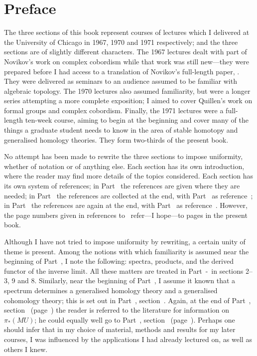 \documentclass[main]{subfiles}
\begin{document}
\chapter*{Preface}
The three sections of this book represent courses of lectures which I delivered at the University of Chicago in 1967, 1970 and 1971 respectively; and the three sections are of slightly different characters.
The 1967 lectures dealt with part of Novikov's work on complex cobordism while that work was still new---they were prepared before I had access to a translation of Novikov's full-length paper, . 
They were delivered as seminars to an audience assumed to be familiar with algebraic topology. 
The 1970 lectures also assumed familiarity, but were a longer series attempting a more complete exposition; I aimed to cover Quillen's work on formal groups and complex cobordism.
Finally, the 1971 lectures were a full-length ten-week course, aiming to begin at the beginning and cover many of the things a graduate student needs to know in the area of stable homotopy and generalised homology theories.
They form two-thirds of the present book.

No attempt has been made to rewrite the three sections to impose uniformity, whether of notation or of anything else. 
Each section has its own introduction, where the reader may find more details of the topics considered. 
Each section has its own system of references; in Part~ the
references are given where they are needed; in Part~ the references are collected at the end, with Part~ as reference~\plscite{[2]}; in Part~ the references are again at the end, with Part~ as reference~. 
However, the page numbers given in references to~\plscite{[2]} refer---I hope---to pages in the present book.

Although I have not tried to impose uniformity by rewriting, a certain unity of theme is present. 
Among the notions with which familiarity is assumed near the beginning of Part~, I note the following: spectra, products, and the derived functor of the inverse limit. 
All these matters are treated in Part~-~in sections 2--3, 9 and 8. Similarly, near the beginning of Part~, I assume it known that a spectrum determines a generalised homology theory and a generalised cohomology theory; this is set out in Part~, section~. 
Again, at the end of Part~, section~ (page~) the reader is referred to the literature for information on $\pi_{*} (MU)$; he could equally well go to Part~, section~ (page~). Perhaps one should infer that in my choice of material, methods and results for my later courses, I was influenced by the applications I had already lectured on, as well as others I knew.
\end{document}
